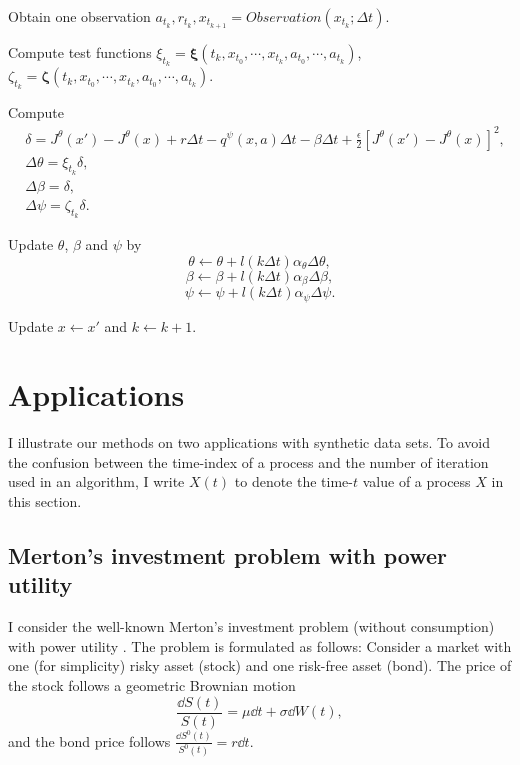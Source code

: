 \begin{algorithm}[htbp]
\begin{algorithmic}
{{				Obtain one observation $a_{t_k}, r_{t_k}, x_{t_{k+1}} = \textit{Observation}(x_{t_k};\Delta t)$.
				
				
			}
			
			Compute test functions $\xi_{t_k} = \bm{\xi}(t_k,x_{t_0},\cdots, x_{t_k},a_{t_0},\cdots, a_{t_k})$, $\zeta_{t_k} = \bm{\zeta}(t_k, x_{t_0},\cdots, x_{t_k},a_{t_0},\cdots, a_{t_k})$.		
			
			Compute
			\[\begin{aligned}
				& \delta = J^{\theta}(x') - J^{\theta}(x) + r\Delta t -q^{\psi}(x,a)\Delta t - \beta \Delta t + \frac{\epsilon}{2}\left[ J^{\theta}(x') - J^{\theta}(x)  \right]^2, \\
				& \Delta \theta = \xi_{t_k} \delta, \\
				& \Delta \beta = \delta, \\
				& \Delta \psi =\zeta_{t_k} \delta.
			\end{aligned}  \]
			
			Update $\theta$, $\beta$ and $\psi$ by
			\[ \theta \leftarrow \theta + l(k\Delta t)\alpha_{\theta} \Delta \theta,\]
			\[ \beta \leftarrow \beta + l(k\Delta t)\alpha_{\beta} \Delta \beta,\]
			\[ \psi \leftarrow \psi + l(k\Delta t)\alpha_{\psi}   \Delta \psi.  \]
			
			Update $x\leftarrow x'$ and $k \leftarrow k + 1$.
		}
		\EndLoop
	\end{algorithmic}
	\label{algo:online ergodic}
\end{algorithm}

\section{Applications}
\label{sec:numerical}
I illustrate our methods on two applications with synthetic data sets. To avoid the confusion between the time-index of a process and the number of iteration used in an algorithm, I write $X(t)$ to denote the time-$t$ value of a process $X$ in this section.
\subsection{Merton's investment problem with power utility}
\label{subsec:merton}
I consider the well-known Merton's investment problem (without consumption) with power utility \citep{merton1969lifetime}. The problem is formulated as follows: Consider a market with one (for simplicity) risky asset (stock) and one risk-free asset (bond). The price of the stock follows a geometric Brownian motion
\[ \frac{\dd S(t)}{S(t)} = \mu\dd t+ \sigma\dd W(t) , \]
and the bond price follows $\frac{\dd S^0(t)}{S^0(t)} = r\dd t$. 

